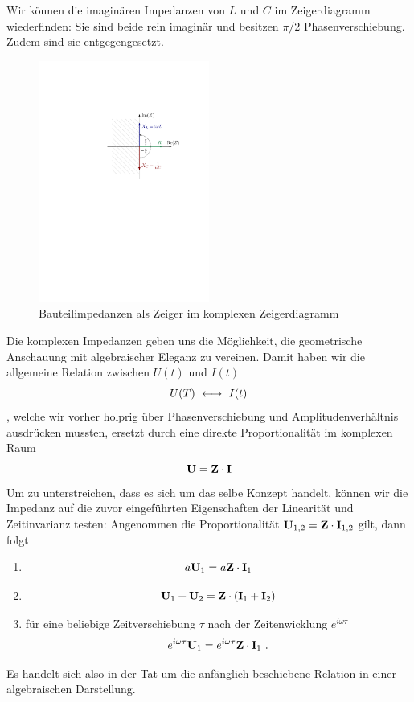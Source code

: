 Wir können die imaginären Impedanzen von $L$ und $C$ im Zeigerdiagramm wiederfinden: Sie sind beide
rein imaginär und besitzen $\pi/2$ Phasenverschiebung. Zudem sind sie entgegengesetzt.
\begin{figure}[H]
    \centering
    \includegraphics[width=0.5\textwidth]{kCompZeiger.pdf}
    \caption{Bauteilimpedanzen als Zeiger im komplexen Zeigerdiagramm}
\end{figure}
Die komplexen Impedanzen geben uns die Möglichkeit, die geometrische Anschauung mit algebraischer Eleganz zu vereinen.
Damit haben wir die allgemeine Relation zwischen $U(t)$ und $I(t)$
\[ U(T) ~\longleftrightarrow~ I(t) \]
, welche wir vorher holprig über Phasenverschiebung
und Amplitudenverhältnis ausdrücken mussten, ersetzt durch eine direkte Proportionalität im komplexen Raum
\[ \mathbf{U} = \mathbf{Z} \cdot \mathbf{I} \]
Um zu unterstreichen, dass es sich um das selbe Konzept handelt, können wir die Impedanz auf die zuvor eingeführten
Eigenschaften der Linearität und Zeitinvarianz testen:
Angenommen die Proportionalität $ \mathbf{U}_{1,2} = \mathbf{Z} \cdot \mathbf{I}_{1,2}$ gilt, dann folgt
\begin{enumerate}[label=(\arabic*)]
    \item
        \[ a\mathbf{U}_1 = a\mathbf{Z} \cdot \mathbf{I}_1 \]
    \item
        \[ \mathbf{U}_1 + \mathbf{U}_2 = \mathbf{Z} \cdot (\mathbf{I}_1 + \mathbf{I}_2) \]
    \item für eine beliebige Zeitverschiebung $\tau$ nach der Zeitenwicklung $e^{i\omega\tau}$
        \[ e^{i\omega\tau}\mathbf{U}_1 = e^{i\omega\tau}\mathbf{Z} \cdot \mathbf{I}_1 ~. \]
\end{enumerate}
Es handelt sich also in der Tat um die anfänglich beschiebene Relation in einer algebraischen Darstellung.

